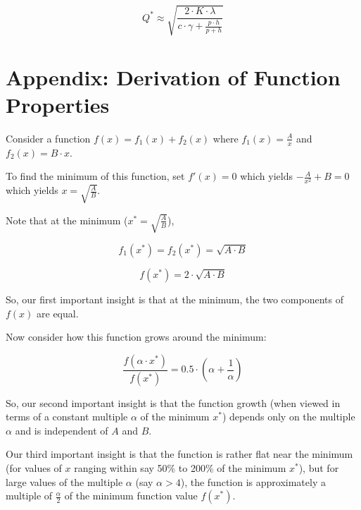 \documentclass[11pt, oneside]{article}   	%
\begin{document}
$$Q^* \approx \sqrt {\frac {2 \cdot K \cdot \lambda} {c \cdot \gamma + \frac {p \cdot h} {p + h}}}$$

\appendix

\section*{Appendix: Derivation of Function Properties}

Consider a function $f(x) = f_1(x) + f_2(x)$ where $f_1(x) = \frac A x$ and $f_2(x) = B \cdot x$.

To find the minimum of this function, set $f'(x) = 0$ which yields $- \frac A {x^2} + B = 0$ which yields $x = \sqrt{\frac A B}$.

Note that at the minimum ($x^* = \sqrt{\frac A B}$),

 $$f_1(x^*) = f_2(x^*) = \sqrt{A \cdot B}$$
 
 $$f(x^*) = 2 \cdot \sqrt{A \cdot B}$$

So, our first important insight is that at the minimum, the two components of $f(x)$ are equal.

Now consider how this function grows around the minimum:

$$\frac {f(\alpha \cdot x^*)} {f(x^*)} = 0.5 \cdot (\alpha + \frac 1 {\alpha})$$

So, our second important insight is that the function growth (when viewed in terms of a constant multiple $\alpha$ of the minimum $x^*$) depends only on the multiple $\alpha$ and is independent of $A$ and $B$.

Our third important insight is that the function is rather flat near the minimum (for values of $x$ ranging within say 50\% to 200\% of the minimum $x^*$), but for large values of the multiple $\alpha$ (say $\alpha > 4$), the function is approximately a multiple of $\frac \alpha 2$ of the minimum function value $f(x^*)$.
\end{document}
